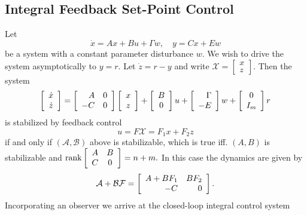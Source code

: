 \documentclass{article}
\begin{document}
\subsection{Integral Feedback Set-Point Control}
Let
$$
\dot{x} = Ax + Bu + \Gamma w, \quad
y = Cx + Ew
$$
be a system with a constant parameter disturbance $w$. We wish to
drive the system asymptotically to $y = r$. Let $\dot{z} = r - y$ and write
$
\mathcal{X} =
\left[\begin{array}{c}
  x \\ z
\end{array}\right].
$
Then the system
$$
\left[\begin{array}{c}
  \dot{x} \\
  \dot{z}
\end{array}\right]
=
\left[\begin{array}{r r}
  A & 0 \\
 -C & 0
\end{array}\right]
\left[\begin{array}{c}
  x \\
  z
\end{array}\right]
+
\left[\begin{array}{c}
  B \\
  0
\end{array}\right]
u
+
\left[\begin{array}{r}
   \Gamma \\
  -E
\end{array}\right]
w
+
\left[\begin{array}{c}
  0 \\
  I_m
\end{array}\right]
r
$$
is stabilized by feedback control
$$
u = F \mathcal{X} = F_1 x + F_2 z
$$
if and only if $(\mathcal{A}, \mathcal{B})$ above is stabilizable,
which is true iff. $(A, B)$ is stabilizable and
$
\mathrm{rank}
\left[\begin{array}{c c}
  A & B \\
  C & 0
\end{array}\right] = n + m.
$
In this case the dynamics are given by
$$
\mathcal{A} + \mathcal{B} \mathcal{F} =
\left[\begin{array}{r r}
  A + BF_1 & BF_2 \\
  -C       & 0
\end{array}\right].
$$
Incorporating an observer we arrive at the closed-loop integral
control system
\end{document}
